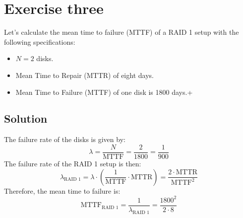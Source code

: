 \section{Exercise three}

Let's calculate the mean time to failure (MTTF) of a RAID 1 setup with the following specifications:
\begin{itemize}
    \item $N=2$ disks.
    \item Mean Time to Repair (MTTR) of eight days.
    \item Mean Time to Failure (MTTF) of one disk is 1800 days.+
\end{itemize}

\subsection*{Solution}
The failure rate of the disks is given by:
\[\lambda=\dfrac{N}{\text{MTTF}}=\dfrac{2}{1800}=\dfrac{1}{900}\]
The failure rate of the RAID 1 setup is then:
\[\lambda_{\text{RAID 1}}=\lambda\cdot\left(\dfrac{1}{\text{MTTF}}\cdot\text{MTTR}\right)=\dfrac{2\cdot\text{MTTR}}{\text{MTTF}^2}\]
Therefore, the mean time to failure is:
\[\text{MTTF}_{\text{RAID 1}}=\dfrac{1}{\lambda_{\text{RAID 1}}}=\dfrac{1800^2}{2\cdot8}\]